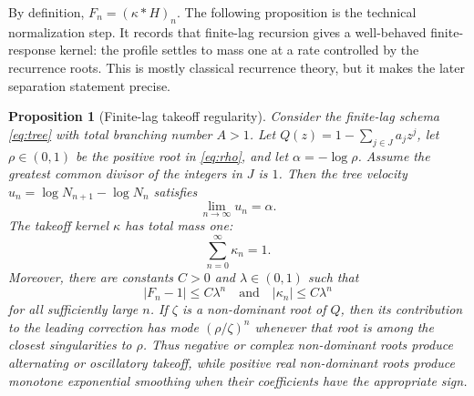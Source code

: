 \documentclass[10pt,twocolumn]{article}
\newtheorem{proposition}{Proposition}
\begin{document}
By definition, \(F_n=(\kappa*H)_n\).  The following proposition is the technical normalization step.  It records that finite-lag recursion gives a well-behaved finite-response kernel: the profile settles to mass one at a rate controlled by the recurrence roots.  This is mostly classical recurrence theory, but it makes the later separation statement precise.

\begin{proposition}[Finite-lag takeoff regularity]\label{prop:takeoff}
Consider the finite-lag schema \eqref{eq:tree} with total branching number \(A>1\).  Let \(Q(z)=1-\sum_{j\in J}a_jz^j\), let \(\rho\in(0,1)\) be the positive root in \eqref{eq:rho}, and let \(\alpha=-\log\rho\).  Assume the greatest common divisor of the integers in \(J\) is \(1\).  Then the tree velocity \(u_n=\log N_{n+1}-\log N_n\) satisfies
\[
        \lim_{n\to\infty}u_n=\alpha.
\]
The takeoff kernel \(\kappa\) has total mass one:
\[
        \sum_{n=0}^{\infty}\kappa_n=1.
\]
Moreover, there are constants \(C>0\) and \(\lambda\in(0,1)\) such that
\[
        |F_n-1|\le C\lambda^n
        \quad\text{and}\quad
        |\kappa_n|\le C\lambda^n
\]
for all sufficiently large \(n\).  If \(\zeta\) is a non-dominant root of \(Q\), then its contribution to the leading correction has mode \((\rho/\zeta)^n\) whenever that root is among the closest singularities to \(\rho\).  Thus negative or complex non-dominant roots produce alternating or oscillatory takeoff, while positive real non-dominant roots produce monotone exponential smoothing when their coefficients have the appropriate sign.
\end{proposition}
\end{document}
